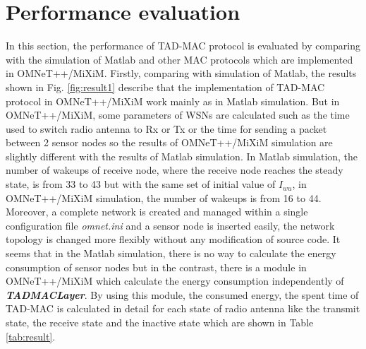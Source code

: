 \documentclass[conference]{IEEEtran}
\begin{document}
\section{Performance evaluation}
In this section, the performance of TAD-MAC protocol is evaluated by comparing with the simulation of Matlab and other MAC protocols which are implemented in OMNeT++/MiXiM. Firstly, comparing with simulation of Matlab, the results shown in Fig. \ref{fig:result1} describe that the implementation of TAD-MAC protocol in OMNeT++/MiXiM work mainly as in Matlab simulation. But in OMNeT++/MiXiM, some parameters of WSNs are calculated such as the time used to switch radio antenna to Rx or Tx or the time for sending a packet between 2 sensor nodes so the results of OMNeT++/MiXiM simulation are slightly different with the results of Matlab simulation. In Matlab simulation, the number of wakeups of receive node, where the receive node reaches the steady state, is from 33 to 43 but with the same set of initial value of \textit{$I_{wu}$}, in OMNeT++/MiXiM simulation, the number of wakeups is from 16 to 44. Moreover, a complete network is created and managed within a single configuration file \textit{omnet.ini} and a sensor node is inserted easily, the network topology is changed more flexibly without any modification of source code. It seems that in the Matlab simulation, there is no way to calculate the energy consumption of sensor nodes but in the contrast, there is a module in OMNeT++/MiXiM which calculate the energy consumption independently of \textit{\textbf{TADMACLayer}}. By using this module, the consumed energy, the spent time of TAD-MAC is calculated in detail for each state of radio antenna like the transmit state, the receive state and the inactive state which are shown in Table \ref{tab:result}.
\begin{figure*}[t]
\centerline{
}
\caption{Behavior of $I_{wu}$ adaptation for number of different initial $I_{wu}$.}
\label{fig:result1}
\end{figure*}
\end{document}
